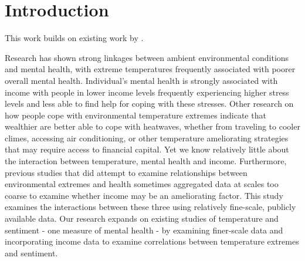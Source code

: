 \documentclass{article}
\begin{document}
    
\section{Introduction}





This work builds on existing work by \citep{baylis_weather_2018}. 





Research has shown strong linkages between ambient environmental conditions and mental health, with extreme temperatures  frequently associated with poorer overall mental health. Individual's mental health is strongly associated with income with people in lower income levels frequently experiencing higher stress levels and less able to find help for coping with these stresses. Other research on how people cope with environmental temperature extremes indicate that wealthier are better able to cope with heatwaves, whether from traveling to cooler climes, accessing air conditioning, or other temperature ameliorating strategies that may require access to financial capital. Yet we know relatively little about the interaction between temperature, mental health and income. Furthermore, previous studies that did attempt to examine relationships between environmental extremes and health sometimes aggregated data at scales too coarse to examine whether income may be an ameliorating factor. This study examines the interactions between these three using relatively fine-scale, publicly available data. Our research expands on existing studies of temperature and sentiment - one measure of mental health - by examining finer-scale data and incorporating income data to examine correlations between temperature extremes and sentiment.
\end{document}
